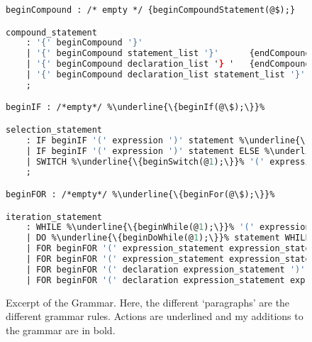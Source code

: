 \documentclass[12pt]{report}
\begin{document}
\begin{figure} 
\begin{lstlisting}[language=Caml, escapechar=\%, morekeywords={beginIF, beginFOR, beginCompound}]
beginCompound : /* empty */ {beginCompoundStatement(@$);}

compound_statement
	: '{' beginCompound '}'										{endCompoundStatement(@$);}
	| '{' beginCompound statement_list '}'		{endCompoundStatement(@$);}
	| '{' beginCompound declaration_list '} '	{endCompoundStatement(@$);}
	| '{' beginCompound declaration_list statement_list '}'	{endCompoundStatement(@$);}
	;

beginIF : /*empty*/ %\underline{\{beginIf(@\$);\}}%

selection_statement
	: IF beginIF '(' expression ')' statement %\underline{\{endIf(@\$);\}}%
	| IF beginIF '(' expression ')' statement ELSE %\underline{\{endIf(@6); beginElse(@7);\}}% statement	%\underline{\{endElse(@9);\}}%
	| SWITCH %\underline{\{beginSwitch(@1);\}}% '(' expression ')' statement %\underline{\{endSwitch(@\$);\}}%
	;

beginFOR : /*empty*/ %\underline{\{beginFor(@\$);\}}%

iteration_statement
	: WHILE %\underline{\{beginWhile(@1);\}}% '(' expression ')' statement %\underline{\{endWhile(@\$);\}}%
	| DO %\underline{\{beginDoWhile(@1);\}}% statement WHILE '(' expression ')' ';' %\underline{\{endDoWhile(@\$);\}}%
	| FOR beginFOR '(' expression_statement expression_statement ')' statement	%\underline{\{endFor(@\$);\}}%
	| FOR beginFOR '(' expression_statement expression_statement expression ')' statement %\underline{\{endFor(@\$);\}}%
	| FOR beginFOR '(' declaration expression_statement ')' statement %\underline{\{endFor(@\$);\}}%
	| FOR beginFOR '(' declaration expression_statement expression ')' statement	%\underline{\{endFor(@\$);\}}%

\end{lstlisting}
\caption[Excerpt of the Grammar]{Excerpt of the Grammar. Here, the different `paragraphs' are the different grammar rules. Actions are underlined and my additions to the grammar are in bold. }
\label{grammar}
\end{figure} 
\end{document}
